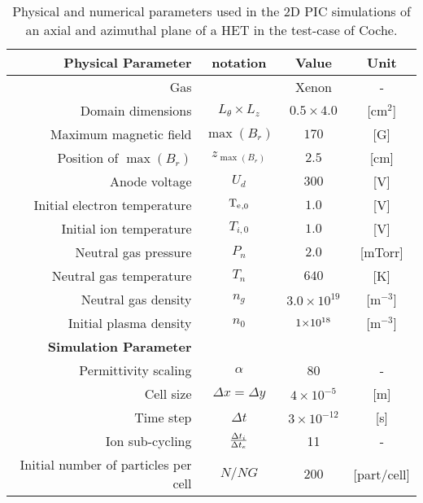\begin{table}[htbp] %
     \centering
     \caption{\label{tab-parameters-coche} Physical and numerical parameters used in the \ac{2D} \ac{PIC} simulations of an axial and azimuthal \ztheta plane of a \ac{HET} in the test-case of Coche.}
     \begin{tabular}{@{}r c c c@{}} 
        \toprule
        {\bf Physical Parameter} & notation & Value & Unit \\
        \midrule
        Gas & & Xenon & - \\
        Domain dimensions & $L_{\theta} \times L_{z}$ & $0.5 \times 4.0$ & [cm$^2$] \\
        Maximum magnetic field & $\max(B_{r})$                    & $170$                 & [{G}] \\
        Position of  $\max(B_{r})$   & $z_{\max(B_{r})}$                    & $2.5$      & [cm] \\
        Anode voltage & $U_d$                    & $300$     & [V] \\

        Initial electron temperature & $\mathrm{T_e}_{,0}  $               & $1.0$                 & [{V}] \\
        Initial ion temperature & $T_{i,0}   $               & $1.0$                 & [{V}] \\
        Neutral gas pressure & $P_{n}     $               & $2.0$                 & [{mTorr}] \\
        Neutral gas temperature & $T_{n}     $               & $640$                 & [{K}] \\
        Neutral gas density & $n_{g}     $               & $3.0 \times 10^{19}$ & [{m}$^{-3}$]\\
        Initial plasma density & $n_0$ & ${{1}{\times}10^{18}}$ &  [{m}$^{-3}$]\\
        \midrule
        {\bf Simulation Parameter} &  &   &  \\
        Permittivity scaling & $\alpha$ & 80 & - \\
        Cell size & $\Delta x = \Delta y$ & $4 \times 10^{-5}$  & [{m}] \\
        Time step & $\Delta t  $                      & $3 \times 10^{-12}$ & [{s}] \\
        Ion sub-cycling & $\frac{\Delta t_{i}}{\Delta t_{e}}$ & 11 & - \\
        Initial number of particles per cell & $N/NG      $    & $200$   & [{part/cell}] \\
        \bottomrule
     \end{tabular}
  \end{table}

